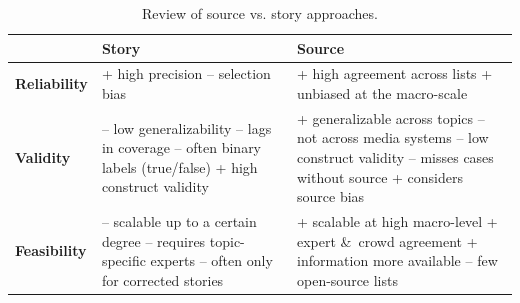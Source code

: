 \begin{table}[H]
\centering
\caption{Review of source vs. story approaches.}
\label{table:table1}
\begin{tabularx}{\textwidth}{ | l | X | X | }
\toprule
        &  \textbf{Story} &  \textbf{Source}           \\
\midrule
\textbf{Reliability} &  
+ high precision \newline
– selection bias
&
+ high agreement across lists \newline
+ unbiased at the macro-scale
\\
 \hline
\textbf{Validity}    &  
– low generalizability \newline
– lags in coverage \newline
– often binary labels (true/false) \newline
+ high construct validity
 & 
+ generalizable across topics \newline
– not across media systems \newline
– low construct validity \newline
– misses cases without source  \newline
+ considers source bias
\\
 \hline
\textbf{Feasibility} &  
– scalable up to a certain degree \newline
– requires topic-specific experts \newline
– often only for corrected stories
& 
+ scalable at high macro-level \newline
+ expert \&\ crowd agreement \newline
+ information more available \newline
– few open-source lists
\\
\bottomrule
\end{tabularx}
\end{table}